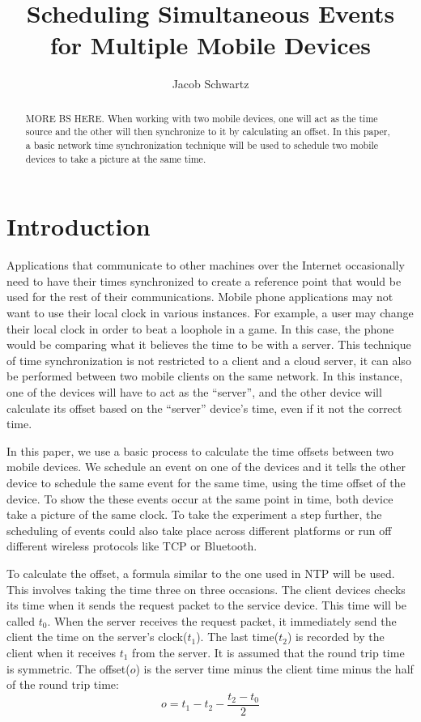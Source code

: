 \documentclass[10pt]{IEEEtran}
\begin{document}
\title{Scheduling Simultaneous Events for Multiple Mobile Devices}
\author{Jacob Schwartz}
\maketitle

\begin{abstract}
MORE BS HERE.
When working with two mobile devices, one will act as the time source and the
other will then synchronize to it by calculating an offset. In this paper, a
basic network time synchronization technique will be used to schedule two mobile
devices to take a picture at the same time.
\end{abstract}

\section{Introduction}

Applications that communicate to other machines over the Internet occasionally
need to have their times synchronized to create a reference point that would be
used for the rest of their communications.  Mobile phone applications may not
want to use their local clock in various instances. For example, a user may
change their local clock in order to beat a loophole in a game. In this case,
the phone would be comparing what it believes the time to be with a server. This
technique of time synchronization is not restricted to a client and a cloud
server, it can also be performed between two mobile clients on the same network.
In this instance, one of the devices will have to act as the ``server'', and the
other device will calculate its offset based on the ``server'' device's time,
even if it not the correct time.

In this paper, we use a basic process to calculate the time offsets between two
mobile devices. We schedule an event on one of the devices and it tells the
other device to schedule the same event for the same time, using the time offset
of the device. To show the these events occur at the same point in time, both
device take a picture of the same clock. To take the experiment a step further,
the scheduling of events could also take place across different platforms or run
off different wireless protocols like TCP or Bluetooth.


To calculate the offset, a formula similar to the one used in NTP will be used.
This involves taking the time three on three occasions. The client devices
checks its time when it sends the request packet to the service device. This
time will be called $t_0$. When the server receives the request packet, it
immediately send the client the time on the server's clock($t_1$). The last
time($t_2$) is recorded by the client when it receives $t_1$ from the server. 
It is assumed that the round trip time is symmetric. The offset($o$) is the
server time minus the client time minus the half of the round trip time:
\begin{equation}
    o = t_1 - t_2 - \frac{t_2 - t_0}{2} 
\end{equation}
\end{document}
